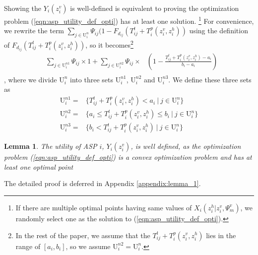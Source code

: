 \documentclass[10pt,journal, compsoc]{IEEEtran}
\newtheorem{lemma}{Lemma}
\begin{document}
Showing the $Y_i(z_i^v)$ is well-defined is equivalent to proving the optimization problem (\ref{eqn:asp_utility_def_opti}) has at least one solution. \footnote{If there are multiple optimal points having same values of $X_i(z_i^h|z_i^v,\Psi_m^v)$, we randomly select one as the solution to (\ref{eqn:asp_utility_def_opti}).} For convenience, we rewrite the term $\sum_{j \in \mathrm{U}_i^n}\Psi_{ij}(1-F_{d_{ij}}(T_{ij}^t+T_i^p(z_i^v, z_i^h))$ using the definition of $F_{d_{ij}}(T_{ij}^t+T_i^p(z_i^v, z_i^h))$, so it becomes\footnote{In the rest of the paper, we assume that the $T_{ij}^t+T_i^p(z_i^v, z_i^h)$ lies in the range of $[a_i, b_i]$, so we assume $\mathrm{U}_i^{n2} = \mathrm{U}_i^{n}$.}
\begin{equation}
\begin{aligned}
&\sum_{j \in \mathrm{U}_i^{n1}}\Psi_{ij} \times 1 +\sum_{j \in \mathrm{U}_i^{n2}}\Psi_{ij} \times &(1-\frac{T_{ij}^t+T_i^p(z_i^v, z_i^h)-a_i}{b_i-a_i}) \\
\end{aligned}
\end{equation}
, where we divide $\mathrm{U}_i^{n}$ into three sets $\mathrm{U}_i^{n1}$, $\mathrm{U}_i^{n2}$ and $\mathrm{U}_i^{n3}$.
We define these three sets as 
\begin{subequations}\label{normal_set_user}
\begin{align}
\mathrm{U}_i^{n1} =& \{T_{ij}^t+T_i^p(z_i^v, z_i^h) < a_i\ |\ j \in \mathrm{U}_i^{n}\}\label{normal_set_user_1} \\
\mathrm{U}_i^{n2} =& \{a_i \leq T_{ij}^t+T_i^p(z_i^v, z_i^h) \leq b_i\ |\ j \in \mathrm{U}_i^{n}\}\label{normal_set_user_2} \\
\mathrm{U}_i^{n3} =& \{ b_i < T_{ij}^t+T_i^p(z_i^v, z_i^h) \ |\ j \in \mathrm{U}_i^{n}\}\label{normal_set_user_3}
\end{align}
\end{subequations}
\begin{lemma}
The utility of ASP $i$, $Y_i(z_i^v)$, is well defined, as the optimization problem (\ref{eqn:asp_utility_def_opti}) is a convex optimization problem and has at least one optimal point 
\end{lemma}
The detailed proof is deferred in Appendix \ref{appendix:lemma_1}.
\end{document}
